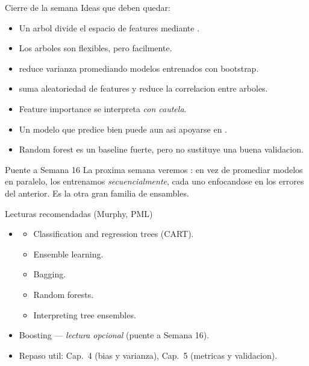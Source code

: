 \begin{frame}{Cierre de la semana}
Ideas que deben quedar:
\begin{itemize}\small
  \item Un arbol divide el espacio de features mediante .
  \item Los arboles son flexibles, pero  facilmente.
  \item {} reduce varianza promediando modelos entrenados con bootstrap.
  \item {} suma aleatoriedad de features y reduce la correlacion entre arboles.
  \item Feature importance se interpreta \emph{con cautela}.
  \item Un modelo que predice bien puede aun asi apoyarse en .
  \item Random forest es un baseline fuerte, pero no sustituye una buena validacion.
\end{itemize}

\vspace{0.4em}
\begin{block}{Puente a Semana 16}
\small
La proxima semana veremos : en vez de promediar modelos en paralelo, los entrenamos \emph{secuencialmente}, cada uno enfocandose en los errores del anterior. Es la otra gran familia de ensambles.
\end{block}
\end{frame}

\begin{frame}{Lecturas recomendadas (Murphy, PML)}
\begin{itemize}\small
  \item {}
  \begin{itemize}\footnotesize
    \item {} Classification and regression trees (CART).
    \item {} Ensemble learning.
    \item {} Bagging.
    \item {} Random forests.
    \item {} Interpreting tree ensembles.
  \end{itemize}
  \item {} Boosting — \emph{lectura opcional} (puente a Semana 16).
  \item Repaso util: Cap.~4 (bias y varianza), Cap.~5 (metricas y validacion).
\end{itemize}
\end{frame}

